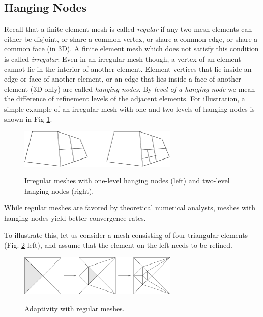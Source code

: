 \documentclass[final,3p,times,twocolumn]{elsarticle}
\begin{document}
\subsection{Hanging Nodes}\label{subsec:hang}

Recall that a finite element mesh is called
{\em regular} if any two mesh elements can 
either be disjoint, or share a common 
vertex, or share a common edge, or share
a common face (in 3D). A finite element 
mesh which does not satisfy this condition 
is called {\em irregular}. Even in an irregular 
mesh though, a vertex of an element cannot lie 
in the interior of another element. Element vertices 
that lie inside an edge or face of another 
element, or an edge that lies inside a face 
of another element (3D only) are called {\em
hanging nodes}. By {\em level of a hanging node}
we mean the difference of refinement levels of
the adjacent elements. For illustration, a simple example 
of an irregular mesh with one and two levels of
hanging nodes is shown in Fig \ref{fig:hang}.

\begin{figure}[!htb]
\begin{center}
 {
\includegraphics[width=7.6cm]{hang.pdf}
}
\end{center}
\vspace{-5mm}
\caption{Irregular meshes with one-level hanging nodes (left)
         and two-level hanging nodes (right).}
\label{fig:hang}
\end{figure}

While regular meshes are favored by theoretical
numerical analysts, meshes with hanging nodes 
yield better convergence rates. 

To illustrate this, let us consider a mesh 
consisting of four triangular 
elements (Fig. \ref{fig:hang-2} left), and 
assume that the element on the left needs to be 
refined. 

\begin{figure}[!htb]
\begin{center}
 {
\includegraphics[width=7.6cm]{hang-2.pdf}
}
\end{center}
\vspace{-5mm}
\caption{Adaptivity with regular meshes.}
\label{fig:hang-2}
\end{figure}
\end{document}
